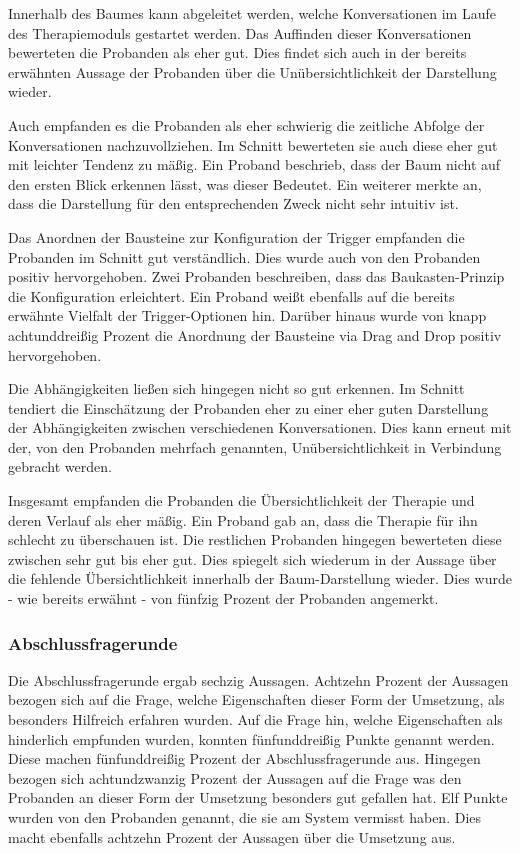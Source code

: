 Innerhalb des Baumes kann abgeleitet werden, welche Konversationen im Laufe des Therapiemoduls gestartet werden. Das Auffinden dieser Konversationen bewerteten die Probanden als eher gut. Dies findet sich auch in der bereits erwähnten Aussage der Probanden über die Unübersichtlichkeit der Darstellung wieder. 

Auch empfanden es die Probanden als eher schwierig die zeitliche Abfolge der Konversationen nachzuvollziehen. Im Schnitt bewerteten sie auch diese eher gut mit leichter Tendenz zu mäßig. Ein Proband beschrieb, dass der Baum nicht auf den ersten Blick erkennen lässt, was dieser Bedeutet. Ein weiterer merkte an, dass die Darstellung für den entsprechenden Zweck nicht sehr intuitiv ist. 

Das Anordnen der Bausteine zur Konfiguration der Trigger empfanden die Probanden im Schnitt gut verständlich. Dies wurde auch von den Probanden positiv hervorgehoben. Zwei Probanden beschreiben, dass das Baukasten-Prinzip die Konfiguration erleichtert. Ein Proband weißt ebenfalls auf die bereits erwähnte Vielfalt der Trigger-Optionen hin. Darüber hinaus wurde von knapp achtunddreißig Prozent die Anordnung der Bausteine via Drag and Drop positiv hervorgehoben.

Die Abhängigkeiten ließen sich hingegen nicht so gut erkennen. Im Schnitt tendiert die Einschätzung der Probanden eher zu einer eher guten Darstellung der Abhängigkeiten zwischen verschiedenen Konversationen. Dies kann erneut mit der, von den Probanden mehrfach genannten, Unübersichtlichkeit in Verbindung gebracht werden. 

Insgesamt empfanden die Probanden die Übersichtlichkeit der Therapie und deren Verlauf als eher mäßig. Ein Proband gab an, dass die Therapie für ihn schlecht zu überschauen ist. Die restlichen Probanden hingegen bewerteten diese zwischen sehr gut bis eher gut. Dies spiegelt sich wiederum in der Aussage über die fehlende Übersichtlichkeit innerhalb der Baum-Darstellung wieder. Dies wurde - wie bereits erwähnt - von fünfzig Prozent der Probanden angemerkt. 

\subsubsection{Abschlussfragerunde}
Die Abschlussfragerunde ergab sechzig Aussagen. Achtzehn Prozent der Aussagen bezogen sich auf die Frage, welche Eigenschaften dieser Form der Umsetzung, als besonders Hilfreich erfahren wurden. Auf die Frage hin, welche Eigenschaften als hinderlich empfunden wurden, konnten fünfunddreißig Punkte genannt werden. Diese machen fünfunddreißig Prozent der Abschlussfragerunde aus. Hingegen bezogen sich achtundzwanzig Prozent der Aussagen auf die Frage was den Probanden an dieser Form der Umsetzung besonders gut gefallen hat. Elf Punkte wurden von den Probanden genannt, die sie am System vermisst haben. Dies macht ebenfalls achtzehn Prozent der Aussagen über die Umsetzung aus. 

